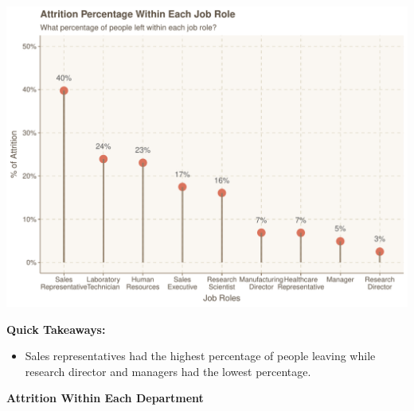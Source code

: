 \documentclass[
]{article}
\providecommand{\tightlist}{%
  \setlength{\itemsep}{0pt}\setlength{\parskip}{0pt}}
\begin{document}
\includegraphics{figures/Attrition Within Job Role-1.pdf}

\textbf{Quick Takeaways:}

\begin{itemize}
\tightlist
\item
  Sales representatives had the highest percentage of people leaving
  while research director and managers had the lowest percentage.
\end{itemize}

\textbf{Attrition Within Each Department}
\end{document}
